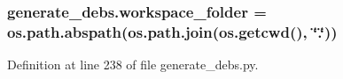 \subsubsection[{\texorpdfstring{workspace\+\_\+folder}{workspace_folder}}]{\setlength{\rightskip}{0pt plus 5cm}generate\+\_\+debs.\+workspace\+\_\+folder = os.\+path.\+abspath(os.\+path.\+join(os.\+getcwd(), \char`\"{}.\char`\"{}))}\hypertarget{namespacegenerate__debs_acb69863b90257249a30e43ebacfb8bd8}{}\label{namespacegenerate__debs_acb69863b90257249a30e43ebacfb8bd8}


Definition at line 238 of file generate\+\_\+debs.\+py.

